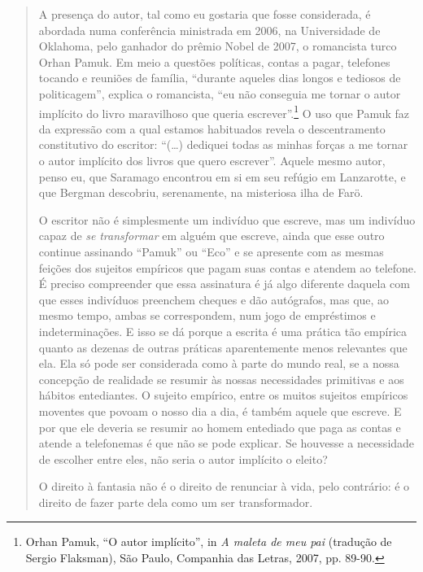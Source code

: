\begin{quote}
A presença do autor, tal como eu gostaria que fosse considerada, é
abordada numa conferência ministrada em 2006, na Universidade de
Oklahoma, pelo ganhador do prêmio Nobel de 2007, o romancista turco
Orhan Pamuk. Em meio a questões políticas, contas a pagar, telefones
tocando e reuniões de família, ``durante aqueles dias longos e tediosos
de politicagem'', explica o romancista, ``eu não conseguia me tornar o
autor implícito do livro maravilhoso que queria escrever''.\footnote{Orhan
  Pamuk, ``O autor implícito'', in \emph{A maleta de meu pai} (tradução
  de Sergio Flaksman), São Paulo, Companhia das Letras, 2007, pp. 89-90.}
O uso que Pamuk faz da expressão com a qual estamos habituados revela o
descentramento constitutivo do escritor: ``(\ldots{}) dediquei todas as
minhas forças a me tornar o autor implícito dos livros que quero
escrever''. Aquele mesmo autor, penso eu, que Saramago encontrou em si
em seu refúgio em Lanzarotte, e que Bergman descobriu, serenamente, na
misteriosa ilha de Farö.

O escritor não é simplesmente um indivíduo que escreve, mas um indivíduo
capaz de \emph{se} \emph{transformar} em alguém que escreve, ainda que
esse outro continue assinando ``Pamuk'' ou ``Eco'' e se apresente com as
mesmas feições dos sujeitos empíricos que pagam suas contas e atendem ao
telefone. É preciso compreender que essa assinatura é já algo diferente
daquela com que esses indivíduos preenchem cheques e dão autógrafos, mas
que, ao mesmo tempo, ambas se correspondem, num jogo de empréstimos e
indeterminações. E isso se dá porque a escrita é uma prática tão
empírica quanto as dezenas de outras práticas aparentemente menos
relevantes que ela. Ela só pode ser considerada como à parte do mundo
real, se a nossa concepção de realidade se resumir às nossas
necessidades primitivas e aos hábitos entediantes. O sujeito empírico,
entre os muitos sujeitos empíricos moventes que povoam o nosso dia a
dia, é também aquele que escreve. E por que ele deveria se resumir ao
homem entediado que paga as contas e atende a telefonemas é que não se
pode explicar. Se houvesse a necessidade de escolher entre eles, não
seria o autor implícito o eleito?

O direito à fantasia não é o direito de renunciar à vida, pelo
contrário: é o direito de fazer parte dela como um ser transformador.


\end{quote}
